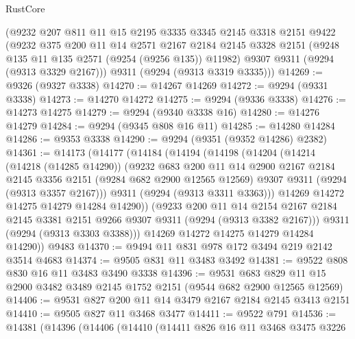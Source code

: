 \begin{lexlean}{RustCore}
\begin{coremodule}
    (@9232
      @207
      @811
      @11
      @15
      @2195
      @3335
      @3345
      @2145
      @3318
      @2151
      @9422
      (@9232
        @375
        @200
        @11
        @14
        @2571
        @2167
        @2184
        @2145
        @3328
        @2151
        (@9248 @135 @11 @135 @2571 (@9254 (@9256 @135)) @11982)
        @9307
        @9311
        (@9294 (@9313 @3329 @2167)))
      @9311
      (@9294 (@9313 @3319 @3335)))
@14269 := @9326 (@9327 @3338)
@14270 := @14267 @14269
@14272 := @9294 (@9331 @3338)
@14273 := @14270 @14272
@14275 := @9294 (@9336 @3338)
@14276 := @14273 @14275
@14279 := @9294 (@9340 @3338 @16)
@14280 := @14276 @14279
@14284 := @9294 (@9345 @808 @16 @11)
@14285 := @14280 @14284
@14286 := @9353 @3338
@14290 := @9294 (@9351 (@9352 @14286) @2382)
@14361 := @14173
    (@14177
      (@14184
        (@14194
          (@14198
            (@14204
              (@14214
                (@14218 (@14285 @14290))
                (@9232
                  @683
                  @200
                  @11
                  @14
                  @2900
                  @2167
                  @2184
                  @2145
                  @3356
                  @2151
                  (@9284 @682 @2900 @12565 @12569)
                  @9307
                  @9311
                  (@9294 (@9313 @3357 @2167)))
                @9311
                (@9294 (@9313 @3311 @3363)))
              @14269
              @14272
              @14275
              @14279
              @14284
              @14290))
          (@9233
            @200
            @11
            @14
            @2154
            @2167
            @2184
            @2145
            @3381
            @2151
            @9266
            @9307
            @9311
            (@9294 (@9313 @3382 @2167)))
          @9311
          (@9294 (@9313 @3303 @3388)))
        @14269
        @14272
        @14275
        @14279
        @14284
        @14290))
    @9483
@14370 := @9494 @11 @831 @978 @172 @3494 @219 @2142 @3514 @4683
@14374 := @9505 @831 @11 @3483 @3492
@14381 := @9522 @808 @830 @16 @11 @3483 @3490 @3338
@14396 := @9531
    @683
    @829
    @11
    @15
    @2900
    @3482
    @3489
    @2145
    @1752
    @2151
    (@9544 @682 @2900 @12565 @12569)
@14406 := @9531 @827 @200 @11 @14 @3479 @2167 @2184 @2145 @3413 @2151
@14410 := @9505 @827 @11 @3468 @3477
@14411 := @9522 @791
@14536 := @14381
    (@14396
      (@14406
        (@14410
          (@14411
            @826
            @16
            @11
            @3468
            @3475
            @3226

\end{coremodule}
\end{lexlean}
